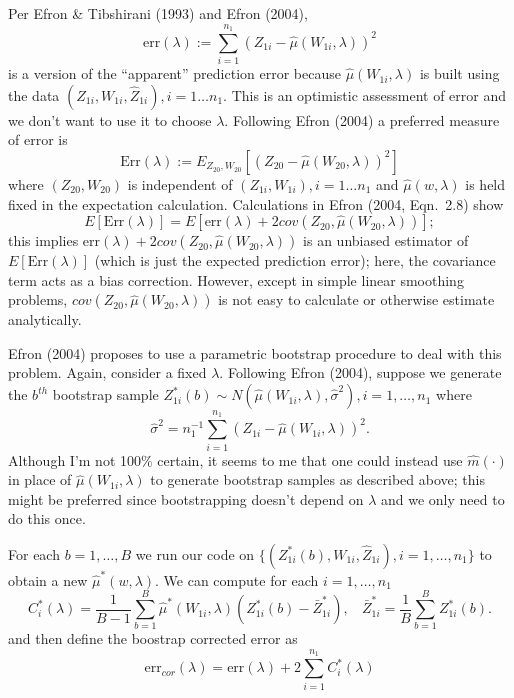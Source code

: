 \documentclass[12pt]{article}
\begin{document}
Per Efron \& Tibshirani (1993) and Efron (2004), 
\[
\mbox{err}(\lambda) := \sum_{i=1}^{n_1} ( Z_{1i} - \hat{\mu}(W_{1i},\lambda))^2
\]
is a version of the ``apparent'' prediction error because
$\hat{\mu}(W_{1i},\lambda)$ is built using the data $(Z_{1i}, W_{1i},
\hat Z_{1i}), i = 1 \ldots n_1.$ This is an optimistic assessment of
error and we don't want to use it to choose $\lambda$.  Following
Efron (2004) a preferred measure of error is
\[
\mbox{Err}(\lambda) := 
E_{Z_{20},W_{20}}\left[ (Z_{20} - \hat{\mu}(W_{20},\lambda))^2 \right]
\]
where $(Z_{20},W_{20})$ is independent of 
$(Z_{1i}, W_{1i}), i = 1 \ldots n_1$ and 
$\hat{\mu}(w,\lambda)$ is held fixed in the expectation
calculation.
Calculations in Efron (2004, Eqn.\ 2.8) show
\[
E[ \mbox{Err}(\lambda) ]
= E[ \mbox{err}(\lambda) + 2 cov(Z_{20},\hat{\mu}(W_{20},\lambda))];
\]
this implies $\mbox{err}(\lambda) + 2
cov(Z_{20},\hat{\mu}(W_{20},\lambda))$ is an unbiased estimator of $E[
  \mbox{Err}(\lambda) ]$ (which is just the expected prediction
error); here, the covariance term acts as a bias correction. However,
except in simple linear smoothing problems,
$cov(Z_{20},\hat{\mu}(W_{20},\lambda))$ is not easy to calculate or
otherwise estimate analytically.

Efron (2004) proposes to use a parametric bootstrap procedure to deal
with this problem. Again, consider a fixed $\lambda$.  Following Efron
(2004), suppose we generate the $b^{th}$ bootstrap sample $Z_{1i}^*(b)
\sim N( \hat \mu(W_{1i},\lambda), \hat \sigma^2 ), i = 1, \ldots, n_1$
where
\[
\hat \sigma^2 = n_1^{-1} \sum_{i=1}^{n_1} (Z_{1i}-\hat \mu(W_{1i},\lambda))^2.
\]
Although I'm not 100\% certain, it seems to me that one could instead
use $\hat m(\cdot)$ in place of $\hat \mu(W_{1i},\lambda)$ to generate
bootstrap samples as described above; this might be preferred since
bootstrapping doesn't depend on $\lambda$ and we only need to do this
once.

For each $b = 1,\ldots,B$ we run our code on $\{(Z^*_{1i}(b), W_{1i}, \hat Z_{1i}),
i=1,\ldots,n_1\}$ to obtain a new $\hat \mu^*(w,\lambda)$.  We can
compute for each $i=1,\ldots,n_1$
\[
C^*_i(\lambda) = \frac{1}{B-1} \sum_{b=1}^B \hat \mu^*(W_{1i},\lambda)
(Z^*_{1i}(b) - \bar Z^*_{1i}), 
~~~~\bar Z^*_{1i} = \frac{1}{B} \sum_{b=1}^B Z^*_{1i}(b).
\]
and then define the boostrap corrected error as
\begin{equation}
  \label{optcor}
  \mbox{err}_{cor}(\lambda)  = \mbox{err}(\lambda) + 2 \sum_{i=1}^{n_1} C^*_i(\lambda)
\end{equation}
\end{document}
